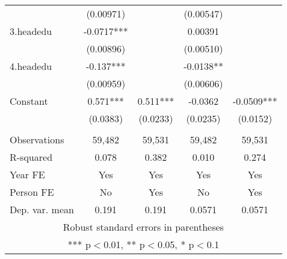 \begin{tabular}{lcccc}
 & (0.00971) &  & (0.00547) &  \\
3.headedu & -0.0717*** &  & 0.00391 &  \\
 & (0.00896) &  & (0.00510) &  \\
4.headedu & -0.137*** &  & -0.0138** &  \\
 & (0.00959) &  & (0.00606) &  \\
Constant & 0.571*** & 0.511*** & -0.0362 & -0.0509*** \\
 & (0.0383) & (0.0233) & (0.0235) & (0.0152) \\
 &  &  &  &  \\
Observations & 59,482 & 59,531 & 59,482 & 59,531 \\
R-squared & 0.078 & 0.382 & 0.010 & 0.274 \\
Year FE & Yes & Yes & Yes & Yes \\
Person FE & No & Yes & No & Yes \\
 Dep. var. mean & 0.191 & 0.191 & 0.0571 & 0.0571 \\ \hline
\multicolumn{5}{c}{ Robust standard errors in parentheses} \\
\multicolumn{5}{c}{ *** p$<$0.01, ** p$<$0.05, * p$<$0.1} \\
\end{tabular}
